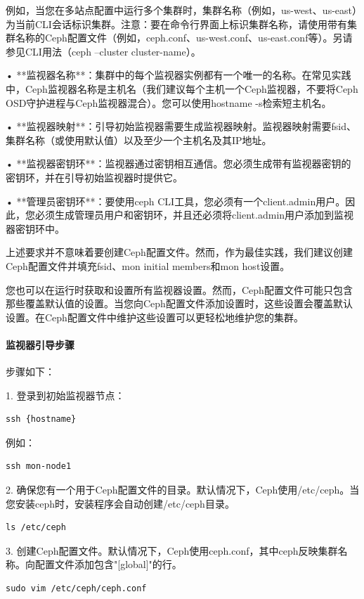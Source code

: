 \documentclass[12pt,UTF8]{ctexbook}
\begin{document}
例如，当您在多站点配置中运行多个集群时，集群名称（例如，us-west、us-east）为当前CLI会话标识集群。注意：要在命令行界面上标识集群名称，请使用带有集群名称的Ceph配置文件（例如，ceph.conf、us-west.conf、us-east.conf等）。另请参见CLI用法（ceph --cluster {cluster-name}）。

• **监视器名称**：集群中的每个监视器实例都有一个唯一的名称。在常见实践中，Ceph监视器名称是主机名（我们建议每个主机一个Ceph监视器，不要将Ceph OSD守护进程与Ceph监视器混合）。您可以使用hostname -s检索短主机名。

• **监视器映射**：引导初始监视器需要生成监视器映射。监视器映射需要fsid、集群名称（或使用默认值）以及至少一个主机名及其IP地址。

• **监视器密钥环**：监视器通过密钥相互通信。您必须生成带有监视器密钥的密钥环，并在引导初始监视器时提供它。

• **管理员密钥环**：要使用ceph CLI工具，您必须有一个client.admin用户。因此，您必须生成管理员用户和密钥环，并且还必须将client.admin用户添加到监视器密钥环中。

上述要求并不意味着要创建Ceph配置文件。然而，作为最佳实践，我们建议创建Ceph配置文件并填充fsid、mon initial members和mon host设置。

您也可以在运行时获取和设置所有监视器设置。然而，Ceph配置文件可能只包含那些覆盖默认值的设置。当您向Ceph配置文件添加设置时，这些设置会覆盖默认设置。在Ceph配置文件中维护这些设置可以更轻松地维护您的集群。

\paragraph{监视器引导步骤}
步骤如下：

1. 登录到初始监视器节点：
\begin{verbatim}
ssh {hostname}
\end{verbatim}

例如：
\begin{verbatim}
ssh mon-node1
\end{verbatim}

2. 确保您有一个用于Ceph配置文件的目录。默认情况下，Ceph使用/etc/ceph。当您安装ceph时，安装程序会自动创建/etc/ceph目录。
\begin{verbatim}
ls /etc/ceph
\end{verbatim}

3. 创建Ceph配置文件。默认情况下，Ceph使用ceph.conf，其中ceph反映集群名称。向配置文件添加包含"[global]"的行。
\begin{verbatim}
sudo vim /etc/ceph/ceph.conf
\end{verbatim}
\end{document}
